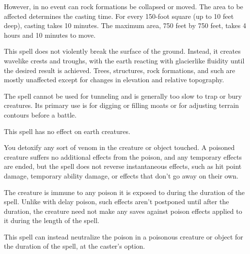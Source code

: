 \begin{multicols}{2}
\begin{small}
\smallskip\noindent However, in no event can rock formations be collapsed or moved. The area to be affected determines the casting time. For every 150-foot square (up to 10 feet deep), casting takes 10 minutes. The maximum area, 750 feet by 750 feet, takes 4 hours and 10 minutes to move.

\smallskip\noindent This spell does not violently break the surface of the ground. Instead, it creates wavelike crests and troughs, with the earth reacting with glacierlike fluidity until the desired result is achieved. Trees, structures, rock formations, and such are mostly unaffected except for changes in elevation and relative topography.

\smallskip\noindent The spell cannot be used for tunneling and is generally too slow to trap or bury creatures. Its primary use is for digging or filling moats or for adjusting terrain contours before a battle.

\smallskip\noindent This spell has no effect on earth creatures.


\noindent You detoxify any sort of venom in the creature or object touched. A poisoned creature suffers no additional effects from the poison, and any temporary effects are ended, but the spell does not reverse instantaneous effects, such as hit point damage, temporary ability damage, or effects that don't go away on their own.

\smallskip\noindent The creature is immune to any poison it is exposed to during the duration of the spell. Unlike with delay poison, such effects aren't postponed until after the duration, the creature need not make any saves against poison effects applied to it during the length of the spell.

\smallskip\noindent This spell can instead neutralize the poison in a poisonous creature or object for the duration of the spell, at the caster's option.


\end{small}
\end{multicols}

